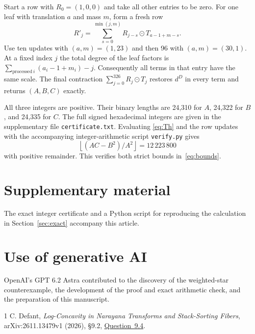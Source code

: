\documentclass[11pt]{article}
\begin{document}
Start a row with \(R_0=(1,0,0)\) and take all other entries to be zero. For one leaf with translation \(a\) and mass \(m\), form a fresh row
\[
 R'_j=\sum_{s=0}^{\min(j,m)}R_{j-s}\odot T_{a-1+m-s}.
\]
Use ten updates with \((a,m)=(1,23)\) and then 96 with \((a,m)=(30,1)\).
At a fixed index \(j\) the total degree of the leaf factors is
\(\sum_{\mathrm{processed}\ i}(a_i-1+m_i)-j\).
Consequently all terms in that entry have the same scale. The final contraction
\(\sum_{j=0}^{326}R_j\odot T_j\) restores \(d^D\) in every term and returns
\((A,B,C)\) exactly.

All three integers are positive. Their binary lengths are 24,310 for \(A\), 24,322 for \(B\), and 24,335 for \(C\). The full signed hexadecimal integers are given in the supplementary file \texttt{certificate.txt}. Evaluating \eqref{eq:Th} and the row updates with the accompanying integer-arithmetic script \texttt{verify.py} gives
\[
 \left\lfloor(AC-B^2)/A^2\right\rfloor=12\,223\,800
\]
with positive remainder. This verifies both strict bounds in~\eqref{eq:bounds}.

\section*{Supplementary material}
The exact integer certificate and a Python script for reproducing the
calculation in Section~\ref{sec:exact} accompany this article.

\section*{Use of generative AI}
OpenAI's GPT 6.2 Astra contributed to the discovery of the weighted-star
counterexample, the development of the proof and exact arithmetic check,
and the preparation of this manuscript.

\begin{thebibliography}{1}
 C. Defant, \emph{Log-Concavity in Narayana Transforms and Stack-Sorting Fibers}, arXiv:2611.13479v1 (2026), \S9.2, \href{https://arxiv.org/html/2611.13479v1#S9.SS2}{Question~9.4}.
\end{thebibliography}
\end{document}

